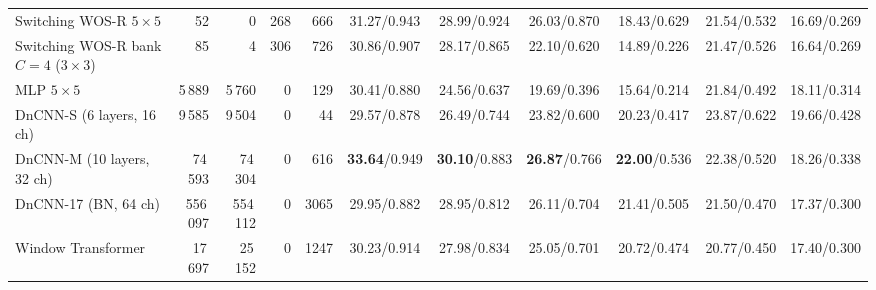 \begin{table}[t]
{\begin{tabular}{lrrrr|cccc|cc}
Switching WOS-R $5{\times}5$ & 52 & 0 & 268 & 666 & 31.27/0.943 & 28.99/0.924 & 26.03/0.870 & 18.43/0.629 & 21.54/0.532 & 16.69/0.269\\
Switching WOS-R bank $C{=}4$ ($3{\times}3$) & 85 & 4 & 306 & 726 & 30.86/0.907 & 28.17/0.865 & 22.10/0.620 & 14.89/0.226 & 21.47/0.526 & 16.64/0.269\\
MLP $5{\times}5$ & 5\,889 & 5\,760 & 0 & 129 & 30.41/0.880 & 24.56/0.637 & 19.69/0.396 & 15.64/0.214 & 21.84/0.492 & 18.11/0.314\\
DnCNN-S (6 layers, 16 ch) & 9\,585 & 9\,504 & 0 & 44 & 29.57/0.878 & 26.49/0.744 & 23.82/0.600 & 20.23/0.417 & 23.87/0.622 & 19.66/0.428\\
DnCNN-M (10 layers, 32 ch) & 74\,593 & 74\,304 & 0 & 616 & \textbf{33.64}/0.949 & \textbf{30.10}/0.883 & \textbf{26.87}/0.766 & \textbf{22.00}/0.536 & 22.38/0.520 & 18.26/0.338\\
DnCNN-17 (BN, 64 ch) & 556\,097 & 554\,112 & 0 & 3065 & 29.95/0.882 & 28.95/0.812 & 26.11/0.704 & 21.41/0.505 & 21.50/0.470 & 17.37/0.300\\
Window Transformer & 17\,697 & 25\,152 & 0 & 1247 & 30.23/0.914 & 27.98/0.834 & 25.05/0.701 & 20.72/0.474 & 20.77/0.450 & 17.40/0.300\\
\bottomrule\end{tabular}}\end{table}